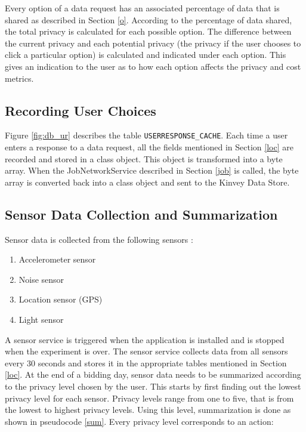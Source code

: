Every option of a data request has an associated percentage of data that is shared as described in Section \ref{o}. According to the percentage of data shared, the total privacy is calculated for each possible option. The difference between the current privacy and each potential privacy (the privacy if the user chooses to click a particular option) is calculated and indicated under each option. This gives an indication to the user as to how each option affects the privacy and cost metrics.

\subsection{Recording User Choices}

Figure \ref{fig:db_ur} describes the table \texttt{USERRESPONSE\_CACHE}. Each time a user enters a response to a data request, all the fields mentioned in Section
\ref{loc} are recorded and stored in a class object. This object is transformed into a byte array.
When the JobNetworkService described in Section \ref{job} is called, the byte array is converted back into a class object and sent to the Kinvey Data Store.

\subsection{Sensor Data Collection and Summarization} 

Sensor data is collected from the following sensors :

\begin{enumerate}
	\item Accelerometer sensor
	\item Noise sensor
    \item Location sensor (GPS)
    \item Light sensor
\end{enumerate}

A sensor service is triggered when the application is installed and is stopped when the experiment is over. The sensor service collects data from all sensors
every 30 seconds and stores it in the appropriate tables mentioned in Section \ref{loc}.
At the end of a bidding day, sensor data needs to be summarized according to the privacy level chosen by the user. This starts by first finding out the lowest privacy level for each sensor. Privacy levels range from one to five, that is from the lowest to highest privacy levels. Using this level,
summarization is done as shown in pseudocode \ref{sum}. Every privacy level corresponds to an action:

